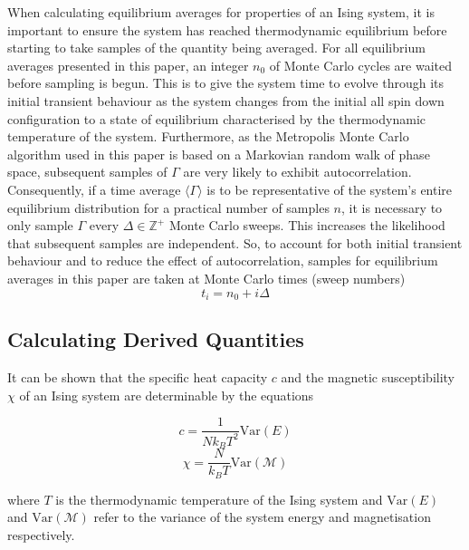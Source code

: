 \documentclass[11pt]{iopart}
\begin{document}
When calculating equilibrium averages for properties of an Ising system, it is important to ensure the system has reached thermodynamic equilibrium before starting to take samples of the quantity being averaged. For all equilibrium averages presented in this paper, an integer $n_0$ of Monte Carlo cycles are waited before sampling is begun. This is to give the system time to evolve through its initial transient behaviour as the system changes from the initial all spin down configuration to a state of equilibrium characterised by the thermodynamic temperature of the system. Furthermore, as the Metropolis Monte Carlo algorithm used in this paper is based on a Markovian random walk of phase space, subsequent samples of $\Gamma$ are very likely to exhibit autocorrelation. Consequently, if a time average $\langle \Gamma \rangle$ is to be representative of the system's entire equilibrium distribution for a practical number of samples $n$, it is necessary to only sample $\Gamma$ every $\Delta \in \mathbb{Z}^{+}$ Monte Carlo sweeps. This increases the likelihood that subsequent samples are independent. So, to account for both initial transient behaviour and to reduce the effect of autocorrelation, samples for equilibrium averages in this paper are taken at Monte Carlo times (sweep numbers)
\begin{equation}
\label{eq:samples}
t_i = n_0 + i \Delta
\end{equation}  

\subsection{Calculating Derived Quantities}

It can be shown that the specific heat capacity $c$ and the magnetic susceptibility $\chi$ of an Ising system are determinable by the equations \cite{handout}
\begin{multicols}{2}
\begin{equation}
\label{eq:heatcapacity}
c = \frac{1}{N k_B T^2} \textrm{Var}(E)
\end{equation}
\begin{equation}
\label{eq:mag}
\chi = \frac{N}{k_B T} \textrm{Var}({\mathcal{M}})
\end{equation}
\end{multicols}where $T$ is the thermodynamic temperature of the Ising system and $\textrm{Var}(E)$ and $\textrm{Var}(\mathcal{M})$ refer to the variance of the system energy and magnetisation respectively.
\end{document}
